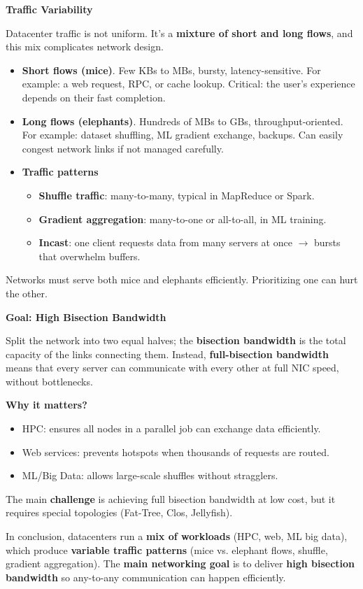 \highspace
\begin{flushleft}
    \textcolor{Green3}{ \textbf{Traffic Variability}}
\end{flushleft}
Datacenter traffic is not uniform. It's a \textbf{mixture of short and long flows}, and this mix complicates network design.
\begin{itemize}
    \item \textbf{Short flows (mice)}. Few KBs to MBs, bursty, latency-sensitive. For example: a web request, RPC, or cache lookup. Critical: the user's experience depends on their fast completion.
    \item \textbf{Long flows (elephants)}. Hundreds of MBs to GBs, throughput-\break oriented. For example: dataset shuffling, ML gradient exchange, backups. Can easily congest network links if not managed carefully.
    \item \textbf{Traffic patterns}
    \begin{itemize}
        \item \textbf{Shuffle traffic}: many-to-many, typical in MapReduce or Spark.
        \item \textbf{Gradient aggregation}: many-to-one or all-to-all, in ML training.
        \item \textbf{Incast}: one client requests data from many servers at once $\rightarrow$ bursts that overwhelm buffers.
    \end{itemize}
\end{itemize}
Networks must serve both mice and elephants efficiently. Prioritizing one can hurt the other.

\newpage

\begin{flushleft}
    \textcolor{Green3}{ \textbf{Goal: High Bisection Bandwidth}}
\end{flushleft}
Split the network into two equal halves; the \textbf{bisection bandwidth} is the total capacity of the links connecting them. Instead, \textbf{full-bisection bandwidth} means that every server can communicate with every other at full NIC speed, without bottlenecks.

\highspace
\textcolor{Green3}{ \textbf{Why it matters?}}
\begin{itemize}
    \item HPC: ensures all nodes in a parallel job can exchange data efficiently.
    \item Web services: prevents hotspots when thousands of requests are routed.
    \item ML/Big Data: allows large-scale shuffles without stragglers.
\end{itemize}
The main \textbf{challenge} is achieving full bisection bandwidth at low cost, but it requires special topologies (Fat-Tree, Clos, Jellyfish).

\highspace
In conclusion, datacenters run a \textbf{mix of workloads} (HPC, web, ML big data), which produce \textbf{variable traffic patterns} (mice vs. elephant flows, shuffle, gradient aggregation). The \textbf{main networking goal} is to deliver \textbf{high bisection bandwidth} so any-to-any communication can happen efficiently.